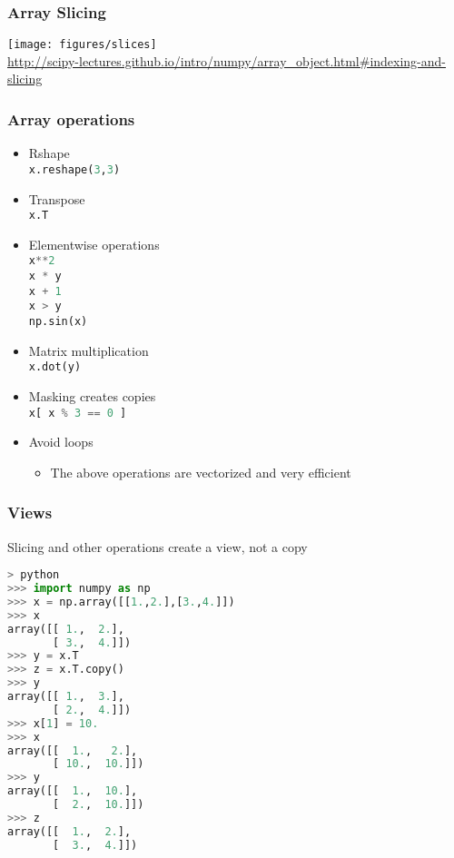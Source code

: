 \documentclass[xcolor=table,10pt,final]{beamer}
\begin{document}
\begin{frame}
  \frametitle{Array Slicing}
  \texttt{[image: figures/slices]}\\
  {\scriptsize \url{http://scipy-lectures.github.io/intro/numpy/array\_object.html\#indexing-and-slicing}}
\end{frame}

\begin{frame}[fragile]
  \frametitle{Array operations}
  \begin{itemize}
    \item Rshape\\
      \lstinline[language=python]|x.reshape(3,3)|
    \item Transpose\\
      \lstinline[language=python]|x.T|
    \item Elementwise operations\\
      \lstinline[language=python]|x**2|\\
      \lstinline[language=python]|x * y|\\
      \lstinline[language=python]|x + 1|\\
      \lstinline[language=python]|x > y|\\
      \lstinline[language=python]|np.sin(x)|
    \item Matrix multiplication\\
      \lstinline[language=python]|x.dot(y)|
    \item Masking creates copies\\
      \lstinline[language=python]|x[ x % 3 == 0 ]|\\
    \item Avoid loops
      \begin{itemize}
        \item The above operations are vectorized and very efficient
      \end{itemize}
  \end{itemize}
\end{frame}

\begin{frame}[fragile]
  \frametitle{Views}
  Slicing and other operations create a view, not a copy
\begin{lstlisting}[language=python]
> python
>>> import numpy as np
>>> x = np.array([[1.,2.],[3.,4.]])
>>> x
array([[ 1.,  2.],
       [ 3.,  4.]])
>>> y = x.T
>>> z = x.T.copy()
>>> y
array([[ 1.,  3.],
       [ 2.,  4.]])
>>> x[1] = 10.
>>> x
array([[  1.,   2.],
       [ 10.,  10.]])
>>> y
array([[  1.,  10.],
       [  2.,  10.]])
>>> z
array([[  1.,  2.],
       [  3.,  4.]])
\end{lstlisting}
\end{frame}
\end{document}
